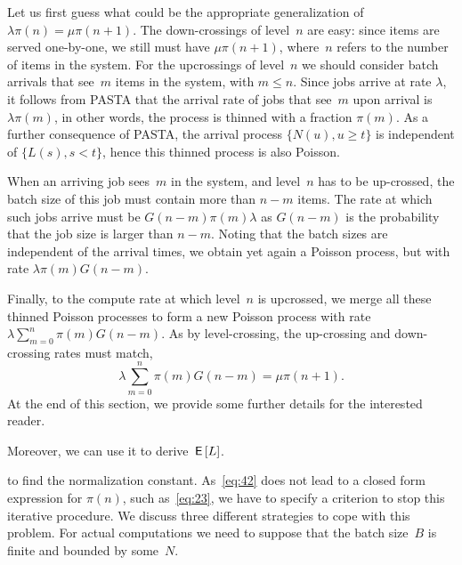 \documentclass[queueing-book.tex]{subfiles}
\begin{document}
Let us first guess what could be the appropriate generalization of $\lambda \pi(n) = \mu \pi(n+1)$.
The down-crossings of level~$n$ are easy: since items are served one-by-one, we still must have $\mu \pi(n+1)$, where~$n$ refers to the number of items
in the system.
For the upcrossings of level~$n$ we should consider batch arrivals that see~$m$ items in the system, with $m\leq n$.
Since jobs arrive at rate $\lambda$, it follows from PASTA that the arrival rate of jobs that see~$m$ upon arrival is~$\lambda \pi(m)$, in other words, the process is thinned with a fraction $\pi(m)$.
As a further consequence of PASTA, the arrival process $\{N(u), u\geq t\}$ is independent of $\{L(s), s< t\}$, hence this thinned process is also Poisson.

When an arriving job sees~$m$ in the system, and level~$n$ has to be up-crossed, the batch size of this job must contain more than $n-m$ items.
The rate at which such jobs arrive must be $G(n-m)\pi(m)\lambda$ as  $G(n-m)$ is the probability that the job size is larger than $n-m$.  Noting that the batch sizes are independent of the arrival times, we obtain yet again a Poisson process, but with rate $\lambda \pi(m) G(n-m)$.

Finally, to the compute rate at which level~$n$ is upcrossed, we merge
all these thinned Poisson processes to form a new Poisson process with rate $\lambda \sum_{m=0}^n \pi(m) G(n-m)$.
As by level-crossing, the up-crossing and down-crossing rates must match,
\begin{equation}\label{eq:42}
\lambda \sum_{m=0}^n \pi(m) G(n-m) = \mu \pi(n+1).
\end{equation}
At the end of this section, we provide some further details for the interested reader.

Moreover, we can use it to derive $\,\mathsf{E}\left[L\right]$.


 to find the normalization constant.
As~\cref{eq:42} does not lead to a closed form expression for $\pi(n)$, such as~\cref{eq:23}, we have to specify a criterion to stop this iterative procedure.
We discuss three different strategies to cope with this problem. For actual computations we need to  suppose that the batch size~$B$ is finite and bounded by some~$N$.
\end{document}
